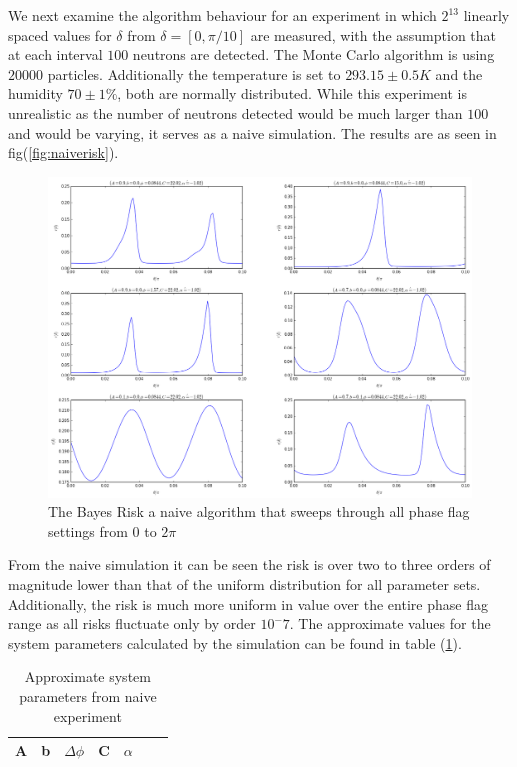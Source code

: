 We next examine the algorithm behaviour for an experiment in which $2^13$ linearly spaced values for $\delta$ from $\delta=[0,\pi/10]$ are measured, with the assumption that at each interval $100$ neutrons are detected. The Monte Carlo algorithm is using $20000$ particles. Additionally the temperature is set to $293.15\pm0.5K$ and the humidity $70\pm1\%$, both are normally distributed. While this experiment is unrealistic as the number of neutrons detected would be much larger than $100$ and would be varying, it serves as a naive simulation. The results are as seen in fig(\ref{fig:naiverisk}). 
\begin{figure}[ht!]
\centering
\includegraphics[scale=0.5]{Figures/naiverisk.png}
\caption{The Bayes Risk a naive algorithm that sweeps through all phase flag settings from $0$ to $2\pi$}
\label{fig:naiverisks}
\end{figure}
From the naive simulation it can be seen the risk is over two to three orders of magnitude lower than that of the uniform distribution for all parameter sets. Additionally, the risk is much more uniform in value over the entire phase flag range as all risks fluctuate only by order $10^-7$. The approximate values for the system parameters calculated by the simulation can be found in table (\ref{tab:naiveparams}). 

\begin{table}[h]
\begin{center}
\begin{tabular}{l*{5}{c}r}
A&b& $\Delta\phi$ & C & $\alpha$ \\
\hline
 
	

\end{tabular}
\caption{Approximate system parameters from naive experiment}
\label{tab:naiveparams}
\end{center}
\end{table}